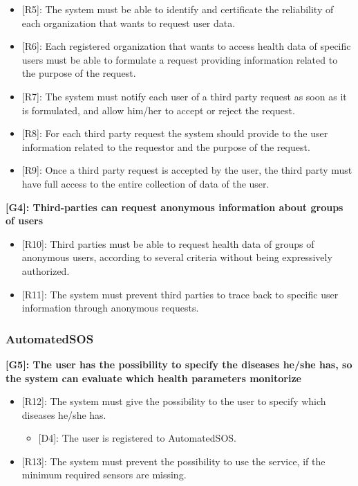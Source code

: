 \begin{itemize}
	\item {[R5]: The system must be able to identify and certificate the reliability of each organization that wants to request user data.}
	\item {[R6]: Each registered organization that wants to access health data of specific users must be able to formulate a request providing information related to the purpose of the request.}
	\item {[R7]: The system must notify each user of a third party request as soon as it is formulated, and allow him/her to accept or reject the request.}
	\item {[R8]: For each third party request the system should provide to the user information related to the requestor and the purpose of the request.}
	\item {[R9]: Once a third party request is accepted by the user, the third party must have full access to the entire collection of data of the user.}
\end{itemize}

\raggedright
\textbf{[G4]: Third-parties can request anonymous information about groups of users}

\begin{itemize}
	\item {[R10]: Third parties must be able to request health data of groups of anonymous users, according to several criteria without being expressively authorized.}
	\item {[R11]: The system must prevent third parties to trace back to specific user information through anonymous requests.}
\end{itemize}

{\color{Blue}\subsubsection{AutomatedSOS}}

\textbf{[G5]: The user has the possibility to specify the diseases he/she has, so the system can evaluate which health parameters monitorize}

\begin{itemize}
	\item {[R12]: The system must give the possibility to the user to specify which diseases he/she has.}
	\begin{itemize}
		\item {[D4]: The user is registered to AutomatedSOS.}
	\end{itemize} 
	\item {[R13]: The system must prevent the possibility to use the service, if the minimum required sensors are missing.}
\end{itemize}

